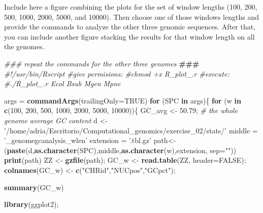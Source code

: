 \documentclass[10pt,a4paper,]{article}
\newenvironment{Shaded}{}{}
\newcommand{\AlertTok}[1]{\textcolor[rgb]{1.00,0.00,0.00}{\textbf{#1}}}
\newcommand{\CommentTok}[1]{\textcolor[rgb]{0.38,0.63,0.69}{\textit{#1}}}
\newcommand{\ControlFlowTok}[1]{\textcolor[rgb]{0.00,0.44,0.13}{\textbf{#1}}}
\newcommand{\DataTypeTok}[1]{\textcolor[rgb]{0.56,0.13,0.00}{#1}}
\newcommand{\DecValTok}[1]{\textcolor[rgb]{0.25,0.63,0.44}{#1}}
\newcommand{\FloatTok}[1]{\textcolor[rgb]{0.25,0.63,0.44}{#1}}
\newcommand{\KeywordTok}[1]{\textcolor[rgb]{0.00,0.44,0.13}{\textbf{#1}}}
\newcommand{\NormalTok}[1]{#1}
\newcommand{\OtherTok}[1]{\textcolor[rgb]{0.00,0.44,0.13}{#1}}
\newcommand{\StringTok}[1]{\textcolor[rgb]{0.25,0.44,0.63}{#1}}
\begin{document}
Include here a figure combining the plots for the set of window lengths
(100, 200, 500, 1000, 2000, 5000, and 10000). Then choose one of those
windows lengths and provide the commands to analyze the other three
genomic sequences. After that, you can include another figure stacking
the results for that window length on all the genomes.


\clearpage
\newpage


\clearpage
\newpage

\begin{Shaded}
\begin{Highlighting}[]
\CommentTok{### repeat the commands for the other three genomes }\AlertTok{###}
\CommentTok{#!/usr/bin/Rscript}
\CommentTok{#give permisions:}
\CommentTok{#chmod +x R_plot_.r}
\CommentTok{#execute:}
\CommentTok{#./R_plot_.r Ecol Bsub Mgen Mpne}

\NormalTok{args =}\StringTok{ }\KeywordTok{commandArgs}\NormalTok{(}\DataTypeTok{trailingOnly=}\OtherTok{TRUE}\NormalTok{)}
\ControlFlowTok{for}\NormalTok{ (SPC }\ControlFlowTok{in}\NormalTok{ args)\{}
  \ControlFlowTok{for}\NormalTok{ (w }\ControlFlowTok{in} \KeywordTok{c}\NormalTok{(}\DecValTok{100}\NormalTok{, }\DecValTok{200}\NormalTok{, }\DecValTok{500}\NormalTok{, }\DecValTok{1000}\NormalTok{, }\DecValTok{2000}\NormalTok{, }\DecValTok{5000}\NormalTok{, }\DecValTok{10000}\NormalTok{))\{}
\NormalTok{    GC_avg <-}\StringTok{ }\FloatTok{50.79}\NormalTok{; }\CommentTok{# the whole genome average GC content}
\NormalTok{    d <-}\StringTok{ '/home/adria/Escritorio/Computational_genomics/exercise_02/stats/'}
\NormalTok{    middle =}\StringTok{ '_genomegcanalysis_wlen'}
\NormalTok{    extension =}\StringTok{ '.tbl.gz'}
\NormalTok{    path<-(}\KeywordTok{paste}\NormalTok{(d,}\KeywordTok{as.character}\NormalTok{(SPC),middle,}\KeywordTok{as.character}\NormalTok{(w),extension, }\DataTypeTok{sep=}\StringTok{""}\NormalTok{))}
    \KeywordTok{print}\NormalTok{(path)}
\NormalTok{    ZZ <-}\StringTok{ }\KeywordTok{gzfile}\NormalTok{(path);}
\NormalTok{    GC_w <-}\StringTok{ }\KeywordTok{read.table}\NormalTok{(ZZ, }\DataTypeTok{header=}\OtherTok{FALSE}\NormalTok{);}
    \KeywordTok{colnames}\NormalTok{(GC_w) <-}\StringTok{ }\KeywordTok{c}\NormalTok{(}\StringTok{"CHRid"}\NormalTok{,}\StringTok{"NUCpos"}\NormalTok{,}\StringTok{"GCpct"}\NormalTok{);}

    \KeywordTok{summary}\NormalTok{(GC_w)}

    \KeywordTok{library}\NormalTok{(ggplot2);}


\end{Highlighting}
\end{Shaded}
\end{document}

